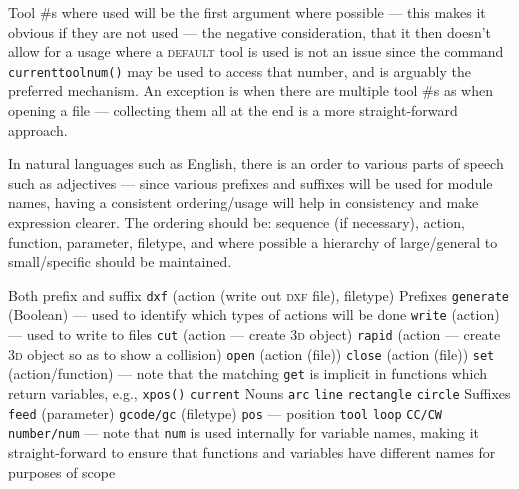 \documentclass{ltxdoc}
\begin{document}
Tool \#s where used will be the first argument where possible --- this makes it obvious if they are not used --- the negative consideration, that it then doesn't allow for a usage where a \textsc{default} tool is used is not an issue since the command \verb|currenttoolnum()| may be used to access that number, and is arguably the preferred mechanism. An exception is when there are multiple tool \#s as when opening a file --- collecting them all at the end is a more straight-forward approach.

In natural languages such as English, there is an order to various parts of speech such as adjectives 
--- since various prefixes and suffixes will be used for module names, having a consistent ordering/usage will help in consistency and make expression clearer. The ordering should be: sequence (if necessary), action, function, parameter, filetype, and where possible a hierarchy of large/general to small/specific should be maintained.

\begin{outline}
\1 Both prefix and suffix
\2 \texttt{dxf} (action (write out \textsc{dxf} file), filetype)
\1 Prefixes
\2 \texttt{generate} (Boolean) --- used to identify which types of actions will be done
\2 \texttt{write} (action) --- used to write to files
\2 \texttt{cut} (action --- create \textsc{3d} object)
\2 \texttt{rapid} (action --- create \textsc{3d} object so as to show a collision)
\2 \texttt{open} (action (file))
\2 \texttt{close} (action (file))
\2 \texttt{set} (action/function) --- note that the matching \verb|get| is implicit in functions which return variables, e.g., \verb|xpos()|
\2 \texttt{current}
\1 Nouns
\2 \texttt{arc}
\2 \texttt{line}
\2 \texttt{rectangle}
\2 \texttt{circle}
\1 Suffixes
\2 \texttt{feed} (parameter)
\2 \texttt{gcode/gc} (filetype)
\2 \texttt{pos} --- position
\2 \texttt{tool}
\2 \texttt{loop}
\2 \texttt{CC/CW}
\2 \texttt{number/num} --- note that \verb|num| is used internally for variable names, making it straight-forward to ensure that functions and variables have different names for purposes of scope
\end{outline}
\end{document}
